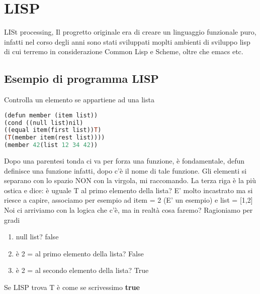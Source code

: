 \documentclass[12pt, a4paper, openany, oneside]{book}
\begin{document}
\section{LISP}
LISt processing, \newline \newline
Il progretto originale era di creare un linguaggio funzionale puro, infatti
nel corso degli anni sono stati sviluppati moplti ambienti di sviluppo lisp
di cui terremo in considerazione Common Lisp e Scheme, oltre che emacs etc.
\subsection{Esempio di programma LISP}
Controlla un elemento se appartiene ad una lista \newline \newline
\begin{lstlisting}[language=Prolog]
(defun member (item list)) 
(cond ((null list)nil) 
((equal item(first list))T) 
(T(member item(rest list)))) 
(member 42(list 12 34 42))
\end{lstlisting}
Dopo una parentesi tonda ci va per forza una funzione, è fondamentale, defun 
definisce una funzione infatti, dopo c'è il nome di tale funzione.
\newline
Gli elementi si separano con lo spazio NON con la virgola, mi raccomando.
\newline
La terza riga è la più ostica e dice: è uguale T al primo elemento della lista?
E' molto incastrato ma si riesce a capire, associamo per esempio ad item = 2
(E' un esempio) e list = [1,2] \newline
Noi ci arriviamo con la logica che c'è, ma in realtà cosa faremo? Ragioniamo 
per gradi
\begin{enumerate}
	\item null list? \color{magenta} false \color{black}
	\item è 2 = al primo elemento della lista? \color{magenta} False \color{black}
	\item è 2 = al secondo elemento della lista? \color{blue}True \color{black}
\end{enumerate}
Se LISP trova T è come se scrivessimo  \color{blue}\textbf{true}\color{black}
\end{document}
